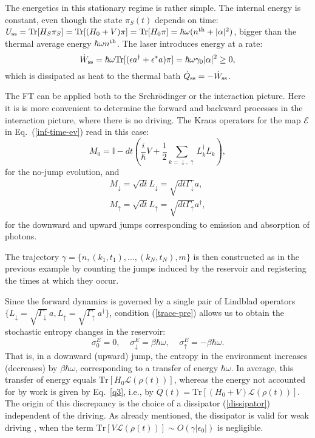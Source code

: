 \documentclass[aps,prx,twocolumn,showpacs,floatfix,superscriptaddress,graphics,longbibliography]{revtex4-1}
\newcommand{\tr}{\mathrm{Tr}}
\newcommand{\E}{{\mathcal E}}
\begin{document}
The energetics in this stationary regime is rather simple. The internal energy is constant, even though the state $\pi_S(t)$ depends on time:   $U_{\rm ss}=\tr [H_S\pi_S]=\tr [(H_0+V)\pi]=\tr [H_0\pi]= \hbar \omega (n^{\rm th}+|\alpha|^2)$, bigger than the thermal average energy $\hbar\omega n^{\rm th}$. The laser introduces energy at a rate:
\begin{equation}\label{sspower}
\dot{W}_{\rm ss} = \hbar \omega \tr[(\epsilon a^\dagger + \epsilon^\ast a) \pi] = \hbar\omega{\gamma_0}{|\alpha|^2} \geq 0,
\end{equation}
which is dissipated as heat to the thermal bath  $\dot Q_{\rm ss}=-\dot W_{\rm ss}$.

The FT can be applied both to the Srchr\"odinger or the interaction picture. Here it is is more convenient to determine the forward and backward processes in the interaction picture, where there is no driving.
The Kraus operators for the map $\E$ in Eq.~(\ref{inf-time-ev}) read in this case:
\begin{equation}
M_0 =  \mathbb{I} - dt  \left(\frac{i}{\hbar} V + \frac{1}{2} \sum_{k=\downarrow, \uparrow} L_{k}^\dagger L_{k}\right), \nonumber
\end{equation}
for the no-jump evolution, and 
\begin{align}\label{Lindop}
M_\downarrow = \sqrt{dt} L_\downarrow = \sqrt{dt \Gamma_\downarrow } a, \nonumber \\ 
M_\uparrow = \sqrt{dt} L_\uparrow = \sqrt{dt \Gamma_\uparrow } a^\dagger, \nonumber
\end{align}
for the downward and upward jumps corresponding to emission and absorption of photons.




The trajectory $\gamma = \{ n, (k_1, t_1), ... ,(k_N, t_N), m \}$ is then constructed as in the previous example by counting the jumps induced by the reservoir and registering the times at which they occur.

Since the forward dynamics is governed by a single pair of Lindblad operators $\{L_{\downarrow} = \sqrt{\Gamma_\downarrow} ~a,  L_{\uparrow} = \sqrt{\Gamma_\uparrow} ~a^\dagger\}$,
condition (\ref{trace-pre}) allows us to obtain the stochastic entropy changes in the reservoir:
\begin{equation}\label{er2}
 \sigma_0^E = 0, ~~~~~ \sigma_{\downarrow}^E = \beta \hbar \omega, ~~~~~ \sigma_{\uparrow}^E = - \beta \hbar \omega.
\end{equation}
That is, in a downward (upward) jump, the entropy in the environment increases (decreases) by $\beta \hbar \omega$, corresponding to a transfer of energy  $\hbar \omega$. 
In average, this transfer of energy equals $\tr[H_0 \mathcal{L}(\rho(t))]$, whereas the energy not accounted for by work is given by Eq.~\eqref{q3}, i.e., by $\dot{Q} (t)= \tr[(H_0+V) \mathcal{L}(\rho(t))]$. The origin of this discrepancy is the choice of a dissipator (\ref{dissipator})  independent of the driving. As already mentioned, the dissipator is valid for weak driving \cite{rivas2010}, when the term  $\tr[V \mathcal{L}(\rho(t))]\sim O(\gamma|\epsilon_0|)$ is negligible.
\end{document}
